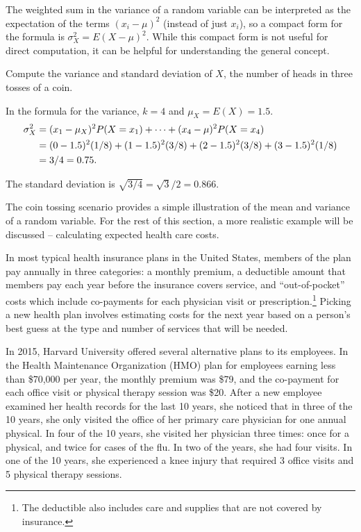 The weighted sum in the variance of a random variable can be interpreted as the expectation of the terms $(x_i - \mu)^2$ (instead of just $x_i$), so a compact form for the formula is $\sigma_X^2 = E(X - \mu)^2$. While this compact form is not useful for direct computation, it can be helpful for understanding the general concept. 

\newpage

\begin{example}{Compute the variance and standard deviation of $X$, the number of heads in three tosses of a coin.}
    
    In the formula for the variance, $k = 4$ and $\mu_X = E(X) = 1.5$. 
    \begin{align*}
    \sigma_X^2 &= (x_1-\mu_X)^2P(X=x_1) + \cdots \notag + (x_4-\mu)^2 P(X=x_4) \notag \\
    	&= (0- 1.5)^2(1/8) + (1 - 1.5)^2 (3/8) + 
        (2 -1.5)^2 (3/8) + (3-1.5)^2 (1/8) \notag \\
        &= 3/4 = 0.75.
    \end{align*}
    
The standard deviation is $\sqrt{3/4} = \sqrt{3}/2 = 0.866$.  

\end{example}

The coin tossing scenario provides a simple illustration of the mean and variance of a random variable. For the rest of this section, a more realistic example will be discussed -- calculating expected health care costs.

\label{healthCareCostsEmployee}
In most typical health insurance plans in the United States, members of the plan pay annually in three categories: a monthly premium, a deductible amount that members pay each year before the insurance covers service, and ``out-of-pocket'' costs which include co-payments for each physician visit or prescription.\footnote{The deductible also includes care and supplies that are not covered by insurance.} Picking a new health plan involves estimating costs for the next year based on a person's best guess at the type and number of services that will be needed.
	
In 2015, Harvard University offered several alternative plans to its employees. In the Health Maintenance Organization (HMO) plan for employees earning less than \$70,000 per year, the monthly premium was \$79, and the co-payment for each office visit or physical therapy session was \$20. After a new employee examined her health records for the last 10 years, she noticed that in three of the 10 years, she only visited the office of her primary care physician  for one annual physical. In four of the 10 years, she visited her physician three times: once for a physical, and twice for cases of the flu. In two of the years, she had four visits. In one of the 10 years, she experienced a knee injury that required 3 office visits and 5 physical therapy sessions.

